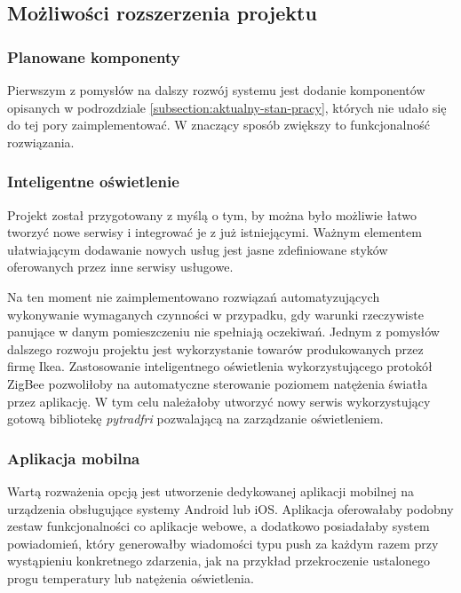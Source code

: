 \subsection{Możliwości rozszerzenia projektu}
\subsubsection{Planowane komponenty}

Pierwszym z pomysłów na dalszy rozwój systemu jest dodanie komponentów opisanych
w podrozdziale \ref{subsection:aktualny-stan-pracy}, których nie udało się do tej pory
zaimplementować. W znaczący sposób zwiększy to funkcjonalność rozwiązania.

\subsubsection{Inteligentne oświetlenie}

Projekt został przygotowany z myślą o tym, by można było możliwie łatwo tworzyć nowe 
serwisy i integrować je z już istniejącymi. Ważnym elementem ułatwiającym dodawanie 
nowych usług jest jasne zdefiniowane styków oferowanych przez inne serwisy usługowe. 

Na ten moment nie zaimplementowano rozwiązań automatyzujących wykonywanie wymaganych 
czynności w przypadku, gdy warunki rzeczywiste panujące w danym pomieszczeniu nie 
spełniają oczekiwań. Jednym z pomysłów dalszego rozwoju projektu jest wykorzystanie 
towarów produkowanych przez firmę Ikea. Zastosowanie inteligentnego oświetlenia 
wykorzystującego protokół ZigBee pozwoliłoby na automatyczne sterowanie poziomem 
natężenia światła przez aplikację. W tym celu należałoby utworzyć nowy serwis 
wykorzystujący gotową bibliotekę \textit{pytradfri} \cite{ikea2022}
pozwalającą na zarządzanie oświetleniem.

\subsubsection{Aplikacja mobilna}

Wartą rozważenia opcją jest utworzenie dedykowanej aplikacji mobilnej na urządzenia
obsługujące systemy Android lub iOS. Aplikacja oferowałaby podobny zestaw funkcjonalności
co aplikacje webowe, a dodatkowo posiadałaby system powiadomień, który generowałby
wiadomości typu push za każdym razem przy wystąpieniu konkretnego zdarzenia, jak na 
przykład przekroczenie ustalonego progu temperatury lub natężenia oświetlenia.

